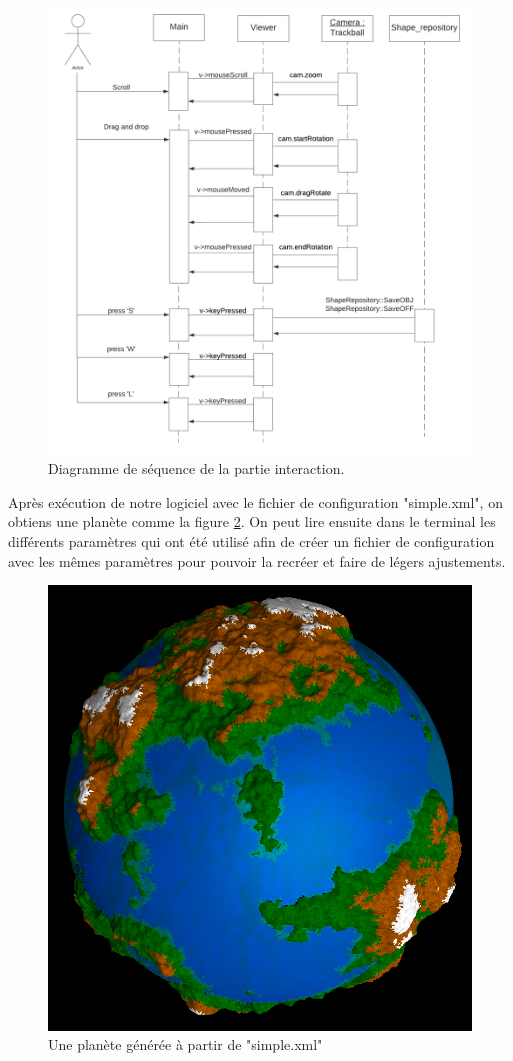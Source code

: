 \documentclass[a4paper]{article}
\begin{document}
\begin{figure}[!ht]
    \begin{center}
        \includegraphics[width=0.7\linewidth]{img/interaction_seq.png} 
        \caption{Diagramme de séquence de la partie interaction.}
        \label{seqinter}
    \end{center}
\end{figure}

\newpage
Après exécution de notre logiciel avec le fichier de configuration "simple.xml", on obtiens une planète comme la figure \ref{notre_planete}. On peut lire ensuite dans le terminal les différents paramètres qui ont été utilisé afin de créer un fichier de configuration avec les mêmes paramètres pour pouvoir la recréer et faire de légers ajustements.\\

\begin{figure}[!ht]
    \begin{center}
        \includegraphics[width=0.6\linewidth]{img/notre_planete.png} 
        \caption{Une planète générée à partir de "simple.xml"}
        \label{notre_planete}
    \end{center}
\end{figure}
\end{document}
